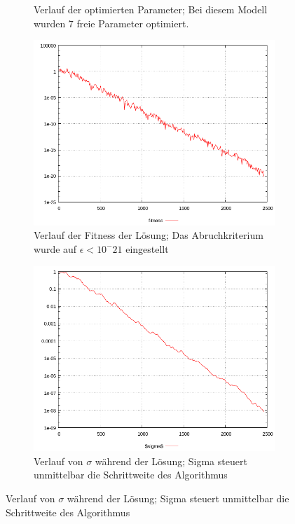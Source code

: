 \begin{figure} [h]
\begin{subfigure}[t]{0.34\textwidth}
                 \caption{ Verlauf der optimierten Parameter; Bei diesem Modell wurden 7 freie Parameter optimiert. }
                 \label{fig:ResA20}\textit{}
         \end{subfigure}
%         
\qquad
         \begin{subfigure}[t]{0.34\textwidth}
                 \centering
                 \includegraphics[width=\textwidth]{common/img/fitness20.png}
                 \caption{ Verlauf der Fitness der Lösung; Das Abruchkriterium wurde auf $\epsilon<10^-21$ eingestellt }
                 \label{fig:ResB20}
         \end{subfigure}
%
\qquad
         \begin{subfigure}[t]{0.34\textwidth}
                 \centering
                 \includegraphics[width=\textwidth]{common/img/sigma20.png}
                 \caption{ Verlauf von $\sigma$ während der Lösung; Sigma steuert unmittelbar die Schrittweite des Algorithmus }
                 \label{fig:ResC20}
         \end{subfigure}
\end{figure}